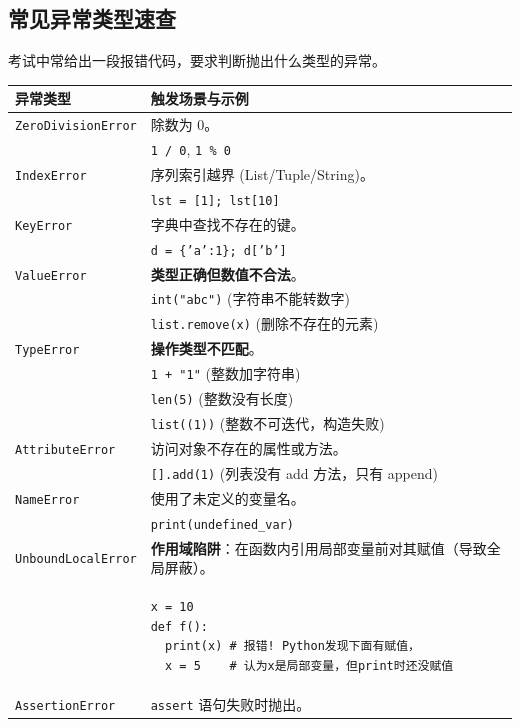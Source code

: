 \documentclass[12pt, a4paper]{article}
\begin{document}
\subsection{常见异常类型速查}

考试中常给出一段报错代码，要求判断抛出什么类型的异常。

\begin{longtable}{p{4.5cm} p{8cm}}
\toprule
\textbf{异常类型} & \textbf{触发场景与示例} \\
\midrule
\texttt{ZeroDivisionError} & 除数为 0。
\\ & \texttt{1 / 0}, \texttt{1 \% 0} \\
\midrule
\texttt{IndexError} & 序列索引越界 (List/Tuple/String)。
\\ & \texttt{lst = [1]; lst[10]} \\
\midrule
\texttt{KeyError} & 字典中查找不存在的键。
\\ & \texttt{d = \{'a':1\}; d['b']} \\
\midrule
\texttt{ValueError} & \textbf{类型正确但数值不合法}。
\\ & \texttt{int("abc")} (字符串不能转数字)
\\ & \texttt{list.remove(x)} (删除不存在的元素) \\
\midrule
\texttt{TypeError} & \textbf{操作类型不匹配}。
\\ & \texttt{1 + "1"} (整数加字符串)
\\ & \texttt{len(5)} (整数没有长度)
\\ & \texttt{list((1))} (整数不可迭代，构造失败) \\
\midrule
\texttt{AttributeError} & 访问对象不存在的属性或方法。
\\ & \texttt{[].add(1)} (列表没有 add 方法，只有 append) \\
\midrule
\texttt{NameError} & 使用了未定义的变量名。
\\ & \texttt{print(undefined\_var)} \\
\midrule
\texttt{UnboundLocalError} & \textbf{作用域陷阱}：在函数内引用局部变量前对其赋值（导致全局屏蔽）。
\\ & \begin{lstlisting}[basicstyle=\ttfamily\tiny, numbers=none, frame=none]
x = 10
def f():
  print(x) # 报错! Python发现下面有赋值，
  x = 5    # 认为x是局部变量，但print时还没赋值
\end{lstlisting} \\
\midrule
\texttt{AssertionError} & \texttt{assert} 语句失败时抛出。 \\
\bottomrule
\end{longtable}
\end{document}
